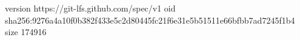 version https://git-lfs.github.com/spec/v1
oid sha256:9276a4a10f0b382f433e5c2d80445fc21f6e31e5b51511e66bfbb7ad7245f1b4
size 174916
